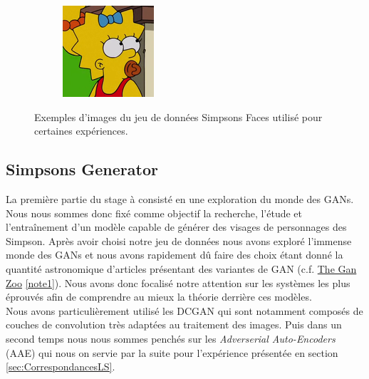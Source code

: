 \documentclass[11pt,francais]{article}
\begin{document}
\begin{figure}[!h]
\begin{subfigure}[b]{0.19\textwidth}
    \end{subfigure}
    \begin{subfigure}[b]{0.19\textwidth}
        \includegraphics[width=\textwidth]{Figures/Simpsons_Dataset/18.png}
    \end{subfigure}
    \caption{Exemples d'images du jeu de données Simpsons Faces utilisé pour certaines expériences.}
    \label{fig:fig1}
\end{figure}

\subsection{Simpsons Generator}
\label{sec:SimpsonsGenerator}
La première partie du stage à consisté en une exploration du monde des GANs. Nous nous sommes donc fixé comme objectif la recherche, l'étude et l'entraînement d'un modèle capable de générer des visages de personnages des Simpson.
Après avoir choisi notre jeu de données nous avons exploré l'immense monde des GANs et nous avons rapidement dû faire des choix étant donné la quantité astronomique d'articles présentant des variantes de GAN (c.f. \href{https://github.com/hindupuravinash/the-gan-zoo}{The Gan Zoo} \ref{note1}).
Nous avons donc focalisé notre attention sur les systèmes les plus éprouvés afin de comprendre au mieux la théorie derrière ces modèles.\\
Nous avons particulièrement utilisé les DCGAN \cite{radford2015unsupervised} qui sont notamment composés de couches de convolution très adaptées au traitement des images. Puis dans un second temps nous nous sommes penchés sur les \textit{Adverserial Auto-Encoders} (AAE) qui nous on servie par la suite pour l'expérience présentée en section \ref{sec:CorrespondancesLS}.
\end{document}
